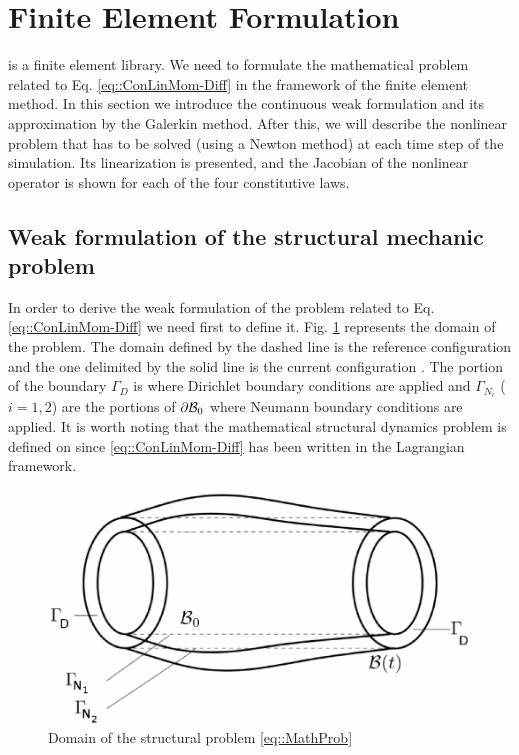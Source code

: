 \section{Finite Element Formulation}
\label{sct-FEF} \LV is a finite element library. We need to formulate
the mathematical problem related to Eq. \eqref{eq::ConLinMom-Diff} in
the framework of the finite element method. In this section we
introduce the continuous weak formulation and its approximation by the
Galerkin method. After this, we will describe the nonlinear problem
that has to be solved (using a Newton method) at each time step of the
simulation. Its linearization is presented, and the Jacobian of the
nonlinear operator is shown for each of the four constitutive laws.

\subsection{Weak formulation of the structural mechanic problem}
\label{sct-ContinuousWF} In order to derive the weak formulation of
the problem related to Eq. \eqref{eq::ConLinMom-Diff} we need first to
define it. Fig. \ref{fig::Domain} represents the domain of the
problem. The domain defined by the dashed line is the reference
configuration \RefCon and the one delimited by the solid line is the
current configuration \CurCon. The portion of the boundary $\Gamma _D$
is where Dirichlet boundary conditions are applied and $\Gamma_{N_i}$
($i=1,2$) are the portions of $\partial \mathcal{B}_0$ where Neumann
boundary conditions are applied. It is worth noting that the
mathematical structural dynamics problem is defined on \RefCon since
\eqref{eq::ConLinMom-Diff} has been written in the Lagrangian
framework.

\begin{figure}[h!]  \centering
  \includegraphics{images/Structure.pdf}
  \caption{Domain of the structural problem \eqref{eq::MathProb}}
  \label{fig::Domain}
\end{figure}

